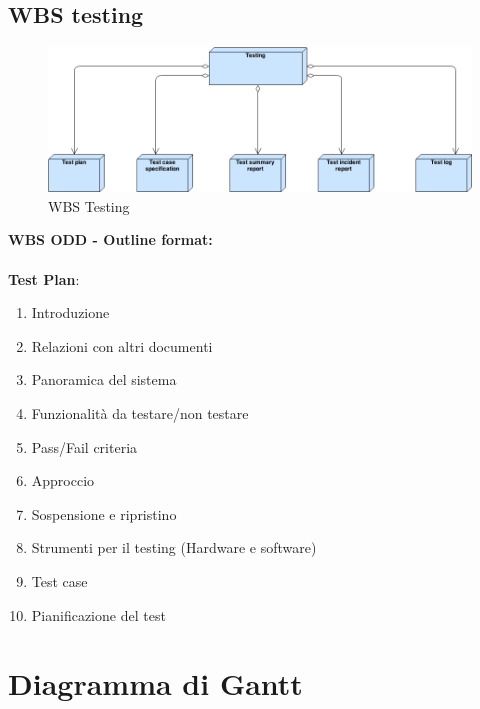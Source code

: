 \subsection{WBS testing}
\begin{figure}[ht]
\centering
\includegraphics[width=\textwidth]{img/WBS_testing.png}
\caption{WBS Testing} 
\end{figure}
\textbf{WBS ODD - Outline format:}\\ \\
\textbf{Test Plan}:
\begin{enumerate}
\item Introduzione
\item Relazioni con altri documenti
\item Panoramica del sistema
\item Funzionalità da testare/non testare
\item Pass/Fail criteria
\item Approccio
\item Sospensione e ripristino
\item Strumenti per il testing (Hardware e software)
\item Test case
\item Pianificazione del test
\end{enumerate}
\clearpage

\section{Diagramma di Gantt}